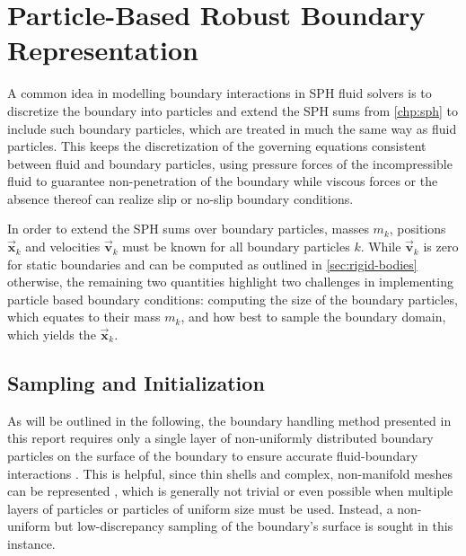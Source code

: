 \documentclass[oneside, a4paper]{book}
\newcommand\vek[1]{\vec{\bm{#1}}}
\begin{document}
    \section{Particle-Based Robust Boundary Representation}\label{sec:boundary}

    A common idea in modelling boundary interactions in SPH fluid solvers is to discretize the boundary into particles and extend the SPH sums from \autoref{chp:sph} to include such boundary particles, which are treated in much the same way as fluid particles. This keeps the discretization of the governing equations consistent between fluid and boundary particles, using pressure forces of the incompressible fluid to guarantee non-penetration of the boundary while viscous forces or the absence thereof can realize slip or no-slip boundary conditions. 

    In order to extend the SPH sums over boundary particles, masses $m_k$, positions $\vek{x}_k $ and velocities $ \vek{v}_k$ must be known for all boundary particles $k$. While $\vek{v}_k$ is zero for static boundaries and can be computed as outlined in \autoref{sec:rigid-bodies} otherwise, the remaining two quantities highlight two challenges in implementing particle based boundary conditions: computing the size of the boundary particles, which equates to their mass $m_k$, and how best to sample the boundary domain, which yields the $\vek{x}_k$.

    \subsection{Sampling and Initialization}\label{subsec:sampling-the-boundary}
    As will be outlined in the following, the boundary handling method presented in this report requires only a single layer of non-uniformly distributed boundary particles on the surface of the boundary to ensure accurate fluid-boundary interactions \autocite{versatile-boundary-akinci}. This is helpful, since thin shells and complex, non-manifold meshes can be represented \autocite{versatile-boundary-akinci}, which is generally not trivial or even possible when multiple layers of particles or particles of uniform size must be used. Instead, a non-uniform but low-discrepancy sampling of the boundary's surface is sought in this instance.
\end{document}
